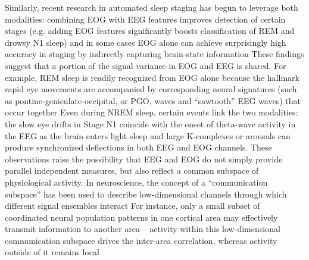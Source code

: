 Similarly, recent research in automated sleep staging has begun to leverage both modalities: combining EOG with EEG features improves detection of certain stages (e.g. adding EOG features significantly boosts classification of REM and drowsy N1 sleep) %
and in some cases EOG alone can achieve surprisingly high accuracy in staging by indirectly capturing brain-state information %
These findings suggest that a portion of the signal variance in EOG and EEG is shared. For example, REM sleep is readily recognized from EOG alone because the hallmark rapid eye movements are accompanied by corresponding neural signatures (such as pontine-geniculate-occipital, or PGO, waves and “sawtooth” EEG waves) that occur together %
Even during NREM sleep, certain events link the two modalities: the slow eye drifts in Stage N1 coincide with the onset of theta-wave activity in the EEG as the brain enters light sleep %
and large K-complexes or arousals can produce synchronized deflections in both EEG and EOG channels. These observations raise the possibility that EEG and EOG do not simply provide parallel independent measures, but also reflect a common subspace of physiological activity. In neuroscience, the concept of a “communication subspace” has been used to describe low-dimensional channels through which different signal ensembles interact %
For instance, only a small subset of coordinated neural population patterns in one cortical area may effectively transmit information to another area – activity within this low-dimensional communication subspace drives the inter-area correlation, whereas activity outside of it remains local %
